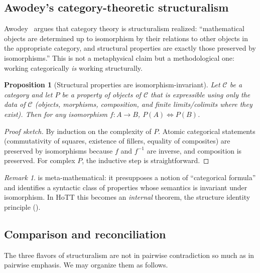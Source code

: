 \documentclass[12pt]{article}
\newtheorem{proposition}[theorem]{Proposition}
\theoremstyle{definition}
\theoremstyle{remark}
\newtheorem{remark}[theorem]{Remark}
\newcommand{\C}{\mathcal{C}}
\begin{document}
\subsection{Awodey's category-theoretic structuralism}

Awodey~\cite{Awodey2004,Awodey2014} argues that category theory is structuralism realized: ``mathematical objects are determined up to isomorphism by their relations to other objects in the appropriate category, and structural properties are exactly those preserved by isomorphisms.'' This is not a metaphysical claim but a methodological one: working categorically \emph{is} working structurally.

\begin{proposition}[Structural properties are isomorphism-invariant]\label{prop:struct-iso}
Let $\C$ be a category and let $P$ be a property of objects of $\C$ that is expressible using only the data of $\C$ (objects, morphisms, composition, and finite limits/colimits where they exist). Then for any isomorphism $f : A \to B$, $P(A) \iff P(B)$.
\end{proposition}

\begin{proof}[Proof sketch]
By induction on the complexity of $P$. Atomic categorical statements (commutativity of squares, existence of fillers, equality of composites) are preserved by isomorphisms because $f$ and $f^{-1}$ are inverse, and composition is preserved. For complex $P$, the inductive step is straightforward.
\end{proof}

\begin{remark}
 is meta-mathematical: it presupposes a notion of ``categorical formula'' and identifies a syntactic class of properties whose semantics is invariant under isomorphism. In HoTT this becomes an \emph{internal} theorem, the structure identity principle ().
\end{remark}

\subsection{Comparison and reconciliation}\label{ssec:compare}

The three flavors of structuralism are not in pairwise contradiction so much as in pairwise emphasis. We may organize them as follows.
\end{document}
